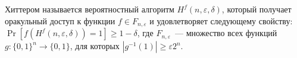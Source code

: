 





\setcounter{curtask}{25}



\begin{definition*}
    Хиттером называется вероятностный алгоритм $H^f(n, \varepsilon, \delta)$, который получает оракульный
    доступ к функции $f \in F_{n, \varepsilon}$ и удовлетворяет следующему свойству: $\Pr[f(H^f(n, \varepsilon,
    \delta)) = 1] \ge 1 - \delta$, где $F_{n, \varepsilon}$~--- множество всех функций $g\colon \{0, 1\}^n \to
    \{0, 1\}$, для которых $|g^{-1}(1)| \ge \varepsilon 2^n$.
\end{definition*}



\breakline








